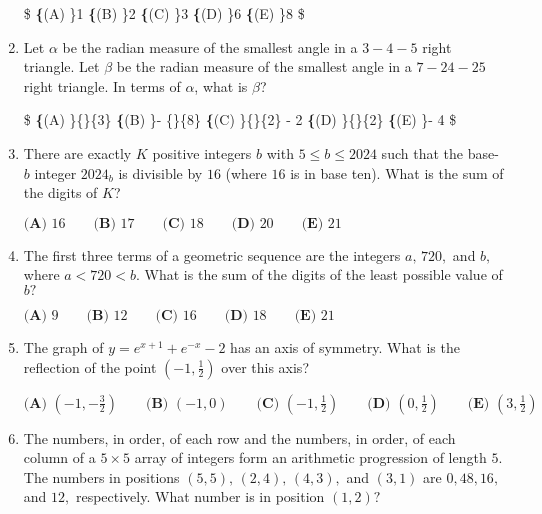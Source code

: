 \documentclass{article}
\begin{document}
\begin{enumerate}[label=\arabic*., itemsep=0.5em]
\$
\textbf\{(A) \}1 \qquad
\textbf\{(B) \}2 \qquad
\textbf\{(C) \}3 \qquad
\textbf\{(D) \}6 \qquad
\textbf\{(E) \}8 \qquad
\$\par \vspace{0.5em}\item Let $\alpha$ be the radian measure of the smallest angle in a $3{-}4{-}5$ right triangle. Let $\beta$ be the radian measure of the smallest angle in a $7{-}24{-}25$ right triangle. In terms of $\alpha$, what is $\beta$?

\$
\textbf\{(A) \}\frac\{\alpha\}\{3\}\qquad
\textbf\{(B) \}\alpha - \frac\{\pi\}\{8\}\qquad
\textbf\{(C) \}\frac\{\pi\}\{2\} - 2\alpha \qquad
\textbf\{(D) \}\frac\{\alpha\}\{2\}\qquad
\textbf\{(E) \}\pi - 4\alpha\qquad
\$\par \vspace{0.5em}\item There are exactly $K$ positive integers $b$ with $5 \leq b \leq 2024$ such that the base-$b$ integer $2024_b$ is divisible by $16$ (where $16$ is in base ten). What is the sum of the digits of $K$?

$\textbf{(A) }16\qquad\textbf{(B) }17\qquad\textbf{(C) }18\qquad\textbf{(D) }20\qquad\textbf{(E) }21$\par \vspace{0.5em}\item The first three terms of a geometric sequence are the integers $a,\,720,$ and $b,$ where $a<720<b.$ What is the sum of the digits of the least possible value of $b?$

$\textbf{(A) } 9 \qquad \textbf{(B) } 12 \qquad \textbf{(C) } 16 \qquad \textbf{(D) } 18 \qquad \textbf{(E) } 21$\par \vspace{0.5em}\item The graph of $y=e^{x+1}+e^{-x}-2$ has an axis of symmetry. What is the reflection of the point $(-1,\tfrac{1}{2})$ over this axis?

$\textbf{(A) }\left(-1,-\frac{3}{2}\right)\qquad\textbf{(B) }(-1,0)\qquad\textbf{(C) }\left(-1,\tfrac{1}{2}\right)\qquad\textbf{(D) }\left(0,\frac{1}{2}\right)\qquad\textbf{(E) }\left(3,\frac{1}{2}\right)$\par \vspace{0.5em}\item The numbers, in order, of each row and the numbers, in order, of each column of a $5 \times 5$ array of integers form an arithmetic progression of length $5{.}$ The numbers in positions $(5, 5), \,(2,4),\,(4,3),$ and $(3, 1)$ are $0, 48, 16,$ and $12{,}$ respectively. What number is in position $(1, 2)?$


\end{enumerate}
\end{document}
